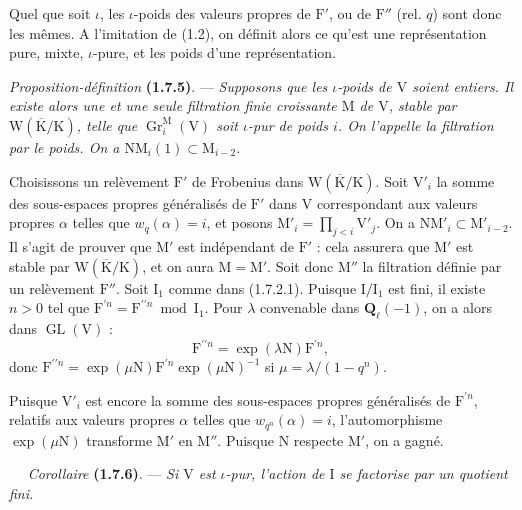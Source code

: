\documentclass[11pt,leqno]{article}
\newcommand{\Page}[1]{\ifvmode\noindent\else\unskip\ \fi{\footnotesize\textcolor{gray}{[p.\,#1]}}\ \ignorespaces}
\begin{document}
Quel que soit \(\iota\), les \(\iota\)-poids des valeurs propres de \(\mathrm{F}'\), ou de \(\mathrm{F}''\) (rel. \(q\)) sont donc les mêmes. A l’imitation de (1.2), on définit alors ce qu’est une représentation pure, mixte, \(\iota\)-pure, et les poids d’une représentation.

\textit{Proposition-définition} \textbf{(1.7.5)}. — \textit{Supposons que les \(\iota\)-poids de \(\mathrm{V}\) soient entiers. Il existe alors une et une seule filtration finie croissante \(\mathrm{M}\) de \(\mathrm{V}\), stable par \(\mathrm{W}(\overline{\mathrm{K}}/\mathrm{K})\), telle que \(\operatorname{Gr}_i^{\mathrm{M}}(\mathrm{V})\) soit \(\iota\)-pur de poids \(i\). On l’appelle la \textup{filtration par le poids}. On a \(\mathrm{N}\mathrm{M}_i(1)\subset\mathrm{M}_{i-2}\).}

Choisissons un relèvement \(\mathrm{F}'\) de Frobenius dans \(\mathrm{W}(\overline{\mathrm{K}}/\mathrm{K})\). Soit \(\mathrm{V}'_i\) la somme des sous-espaces propres généralisés de \(\mathrm{F}'\) dans \(\mathrm{V}\) correspondant aux valeurs propres \(\alpha\) telles que \(w_q(\alpha)=i\), et posons \(\mathrm{M}'_i=\prod\limits_{j<i}\mathrm{V}'_j\). On a \(\mathrm{N}\mathrm{M}'_i\subset\mathrm{M}'_{i-2}\). Il s’agit de prouver que \(\mathrm{M}'\) est indépendant de \(\mathrm{F}'\) : cela assurera que \(\mathrm{M}'\) est stable par \(\mathrm{W}(\overline{\mathrm{K}}/\mathrm{K})\), et on aura \(\mathrm{M}=\mathrm{M}'\). Soit donc \(\mathrm{M}''\) la filtration définie par un relèvement \(\mathrm{F}''\). Soit \(\mathrm{I}_1\) comme dans (1.7.2.1). Puisque \(\mathrm{I}/\mathrm{I}_1\) est fini, il existe \(n>0\) tel que \(\mathrm{F}^{\prime n}=\mathrm{F}^{\prime\prime n}\bmod\mathrm{I}_1\). Pour \(\lambda\) convenable dans \(\mathbf{Q}_\ell(-1)\), on a alors dans \(\operatorname{GL}(\mathrm{V})\) :
\[
\mathrm{F}^{\prime\prime n}=\exp(\lambda\mathrm{N})\mathrm{F}^{\prime n},
\]
donc \(\mathrm{F}^{\prime\prime n}=\exp(\mu\mathrm{N})\mathrm{F}^{\prime n}\exp(\mu\mathrm{N})^{-1}\) si \(\mu=\lambda/(1-q^n)\).

Puisque \(\mathrm{V}'_i\) est encore la somme des sous-espaces propres généralisés de \(\mathrm{F}^{\prime n}\), relatifs aux valeurs propres \(\alpha\) telles que \(w_{q^n}(\alpha)=i\), l’automorphisme \(\exp(\mu\mathrm{N})\) transforme \(\mathrm{M}'\) en \(\mathrm{M}''\). Puisque \(\mathrm{N}\) respecte \(\mathrm{M}'\), on a gagné.

\Page{172}
\textit{Corollaire} \textbf{(1.7.6)}. — \textit{Si \(\mathrm{V}\) est \(\iota\)-pur, l’action de \(\mathrm{I}\) se factorise par un quotient fini.}
\end{document}
